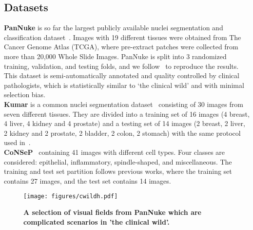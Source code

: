 \documentclass[lettersize,journal]{IEEEtran}
\begin{document}
\subsection{Datasets}
\noindent\textbf{PanNuke} is so far the largest publicly available nuclei segmentation and classification dataset~\cite{gamper2019pannuke,gamper2020pannuke}.
Images with 19 different tissues were obtained from The Cancer Genome Atlas (TCGA), where  pre-extract patches were collected from more than 20,000 Whole Slide Images. 
PanNuke is split into 3 randomized training, validation, and testing folds, and we follow~\cite{gamper2020pannuke} to reproduce the results. This dataset is semi-automatically annotated and quality controlled by clinical pathologists, which is statistically similar to ‘the clinical wild’ and with minimal selection bias.\\
\textbf{Kumar} is a common nuclei segmentation dataset~\cite{kumar} consisting of 30 images from seven different tissues. They are divided into a training set of 16 images (4 breast, 4 liver, 4 kidney and 4 prostate) and a testing set of 14 images (2 breast, 2 liver, 2 kidney and 2 prostate, 2 bladder, 2 colon, 2 stomach) with the same protocol used in~\cite{hovernet,kumar,dist}.\\
\textbf{CoNSeP}~\cite{hovernet} containing 41 images with different cell types. Four classes are considered: epithelial, inflammatory, spindle-shaped, and miscellaneous. The training and test set partition follows  previous works, where the training set contains 27 images, and the test set contains 14 images.


\begin{figure}[t] 
\centering
\texttt{[image: figures/cwildh.pdf]}
\caption{\textbf{A selection of visual fields from PanNuke which are complicated scenarios in 'the clinical wild'.}}
\label{fig:cwild}
\end{figure}
\end{document}
